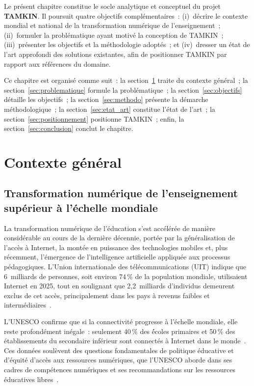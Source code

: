 \documentclass[12pt,a4paper,oneside]{report}
\begin{document}
Le pr\'esent chapitre constitue le socle analytique et conceptuel du projet \textbf{TAMKIN}. Il poursuit quatre objectifs compl\'ementaires~: (i)~d\'ecrire le contexte mondial et national de la transformation num\'erique de l'enseignement~; (ii)~formuler la probl\'ematique ayant motiv\'e la conception de TAMKIN~; (iii)~pr\'esenter les objectifs et la m\'ethodologie adopt\'es~; et (iv)~dresser un \'etat de l'art approfondi des solutions existantes, afin de positionner TAMKIN par rapport aux r\'ef\'erences du domaine.

Ce chapitre est organis\'e comme suit~: la section~\ref{sec:contexte} traite du contexte g\'en\'eral~; la section~\ref{sec:problematique} formule la probl\'ematique~; la section~\ref{sec:objectifs} d\'etaille les objectifs~; la section~\ref{sec:methodo} pr\'esente la d\'emarche m\'ethodologique~; la section~\ref{sec:etat_art} constitue l'\'etat de l'art~; la section~\ref{sec:positionnement} positionne TAMKIN~; enfin, la section~\ref{sec:conclusion} conclut le chapitre.

\section{Contexte g\'en\'eral}
\label{sec:contexte}

\subsection{Transformation num\'erique de l'enseignement sup\'erieur \`a l'\'echelle mondiale}

La transformation num\'erique de l'\'education s'est acc\'el\'er\'ee de mani\`ere consid\'erable au cours de la derni\`ere d\'ecennie, port\'ee par la g\'en\'eralisation de l'acc\`es \`a Internet, la mont\'ee en puissance des technologies mobiles et, plus r\'ecemment, l'\'emergence de l'intelligence artificielle appliqu\'ee aux processus p\'edagogiques. L'Union internationale des t\'el\'ecommunications (UIT) indique que 6~milliards de personnes, soit environ 74\,\% de la population mondiale, utilisaient Internet en 2025, tout en soulignant que 2,2~milliards d'individus demeurent exclus de cet acc\`es, principalement dans les pays \`a revenus faibles et interm\'ediaires~\cite{itu_facts_2025}.

L'UNESCO confirme que si la connectivit\'e progresse \`a l'\'echelle mondiale, elle reste profond\'ement in\'egale~: seulement 40\,\% des \'écoles primaires et 50\,\% des \'etablissements du secondaire inf\'erieur sont connect\'es \`a Internet dans le monde~\cite{unesco_gem_2023}. Ces donn\'ees soul\`event des questions fondamentales de politique \'educative et d'\'equit\'e d'acc\`es aux ressources num\'eriques, que l'UNESCO aborde dans ses cadres de comp\'etences num\'eriques et ses recommandations sur les ressources \'educatives libres~\cite{unesco_oer_2019,unesco_digital_2026}.
\end{document}

